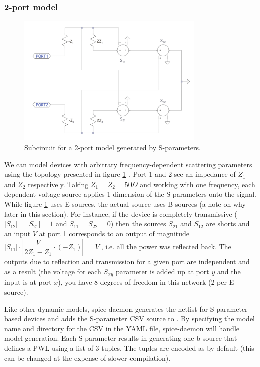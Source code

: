 \subsubsection{2-port model}

\begin{figure}
    \centering
    \includegraphics[width=0.8\textwidth]{figs/2port.png}
    \caption{Subcircuit for a 2-port model generated by S-parameters.}
    \label{fig:2port}
\end{figure}

We can model devices with arbitrary frequency-dependent scattering parameters 
using the topology presented in figure \ref{fig:2port} \cite{microsim}. Port 1 and 2 see
an impedance of $Z_1$ and $Z_2$ respectively. Taking $Z_1=Z_2=50\Omega$ and
working with one frequency, each dependent voltage source applies 1 dimension
of the S parameters onto the signal. While figure \ref{fig:2port} uses E-sources,
the actual source uses B-sources (a note on why later in this section).
For instance, if the device is completely
transmissive ($|S_{12}|=|S_{21}|=1$ and $S_{11}=S_{22}=0$) then the sources $S_{21}$
and $S_{12}$ are shorts and an input $V$ at port 1 corresponds to an output of 
magnitude $|S_{11}|\cdot \left|\dfrac{V}{2Z_1-Z_1}\cdot (-Z_1)\right|=|V|$, i.e.
all the power was reflected back. The outputs due to reflection and transmission 
for a given port are independent and as a result (the voltage for each $S_{xy}$ parameter is
added up at port $y$ and the input is at port $x$), you have 8 degrees of freedom in this
network (2 per E-source).

Like other dynamic models, spice-daemon generates the netlist for S-parameter-based
devices and adds the S-parameter CSV source to . By specifying
the model name and directory for the CSV in the YAML file, spice-daemon will handle model 
generation. Each S-parameter results in generating one b-source that defines a PWL using
a list of 3-tuples. The tuples are encoded as  by default (this 
can be changed at the expense of slower compilation).

